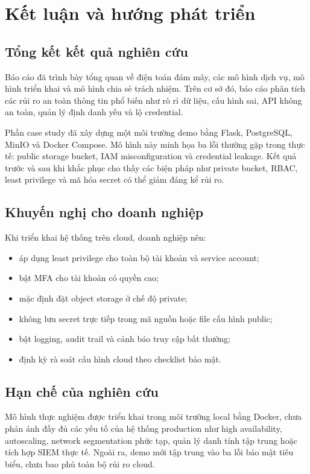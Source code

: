 \chapter{Kết luận và hướng phát triển}

\section{Tổng kết kết quả nghiên cứu}
Báo cáo đã trình bày tổng quan về điện toán đám mây, các mô hình dịch vụ, mô hình triển khai và mô hình chia sẻ trách nhiệm. Trên cơ sở đó, báo cáo phân tích các rủi ro an toàn thông tin phổ biến như rò rỉ dữ liệu, cấu hình sai, API không an toàn, quản lý định danh yếu và lộ credential.

Phần case study đã xây dựng một môi trường demo bằng Flask, PostgreSQL, MinIO và Docker Compose. Mô hình này minh họa ba lỗi thường gặp trong thực tế: public storage bucket, IAM misconfiguration và credential leakage. Kết quả trước và sau khi khắc phục cho thấy các biện pháp như private bucket, RBAC, least privilege và mã hóa secret có thể giảm đáng kể rủi ro.

\section{Khuyến nghị cho doanh nghiệp}
Khi triển khai hệ thống trên cloud, doanh nghiệp nên:
\begin{itemize}
    \item áp dụng least privilege cho toàn bộ tài khoản và service account;
    \item bật MFA cho tài khoản có quyền cao;
    \item mặc định đặt object storage ở chế độ private;
    \item không lưu secret trực tiếp trong mã nguồn hoặc file cấu hình public;
    \item bật logging, audit trail và cảnh báo truy cập bất thường;
    \item định kỳ rà soát cấu hình cloud theo checklist bảo mật.
\end{itemize}

\section{Hạn chế của nghiên cứu}
Mô hình thực nghiệm được triển khai trong môi trường local bằng Docker, chưa phản ánh đầy đủ các yếu tố của hệ thống production như high availability, autoscaling, network segmentation phức tạp, quản lý danh tính tập trung hoặc tích hợp SIEM thực tế. Ngoài ra, demo mới tập trung vào ba lỗi bảo mật tiêu biểu, chưa bao phủ toàn bộ rủi ro cloud.

